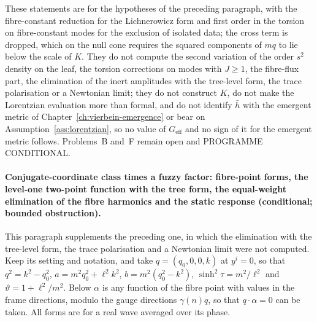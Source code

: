 These statements are for the hypotheses of the preceding paragraph, with the fibre-constant reduction for the Lichnerowicz form and first order in the torsion on fibre-constant modes for the exclusion of isolated data; the cross term is dropped, which on the null cone requires the squared components of \(mq\) to lie below the scale of \(K\). They do not compute the second variation of the order \(s^2\) density on the leaf, the torsion corrections on modes with \(J\ge1\), the fibre-flux part, the elimination of the inert amplitudes with the tree-level form, the trace polarisation or a Newtonian limit; they do not construct \(K\), do not make the Lorentzian evaluation more than formal, and do not identify \(\bar h\) with the emergent metric of Chapter~\ref{ch:vierbein-emergence} or bear on Assumption~\ref{ass:lorentzian}, so no value of \(G_{\mathrm{eff}}\) and no sign of it for the emergent metric follows. Problems~B and~F remain open and PROGRAMME CONDITIONAL.

\paragraph{Conjugate-coordinate class times a fuzzy factor: fibre-point forms, the level-one two-point function with the tree form, the equal-weight elimination of the fibre harmonics and the static response (conditional; bounded obstruction).}
This paragraph supplements the preceding one, in which the elimination with the tree-level form, the trace polarisation and a Newtonian limit were not computed. Keep its setting and notation, and take \(q=(q_0,0,0,k)\) at \(y^i=0\), so that \(q^2=k^2-q_0^2\), \(a=m^2q_0^2+\ell^2k^2\), \(b=m^2(q_0^2-k^2)\), \(\sinh^2\tau=m^2/\ell^2\) and \(\vartheta=1+\ell^2/m^2\). Below \(\alpha\) is any function of the fibre point with values in the frame directions, modulo the gauge directions \(\gamma(n)q\), so that \(q\cdot\alpha=0\) can be taken. All forms are for a real wave averaged over its phase.

